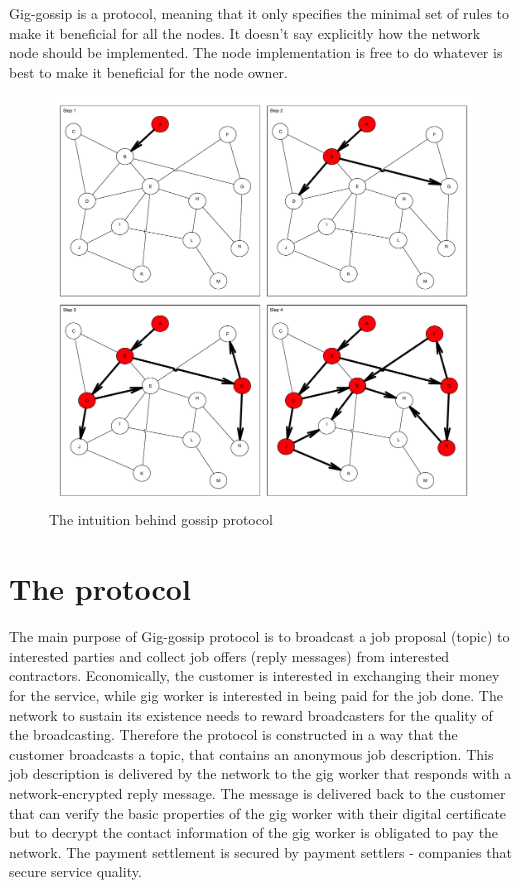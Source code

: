 \documentclass{article}
\begin{document}
Gig-gossip is a protocol, meaning that it only specifies the minimal set of rules to make it beneficial for all the nodes. It doesn't say explicitly how the network node should be implemented. The node implementation is free to do whatever is best to make it beneficial for the node owner.

\begin{figure}
	\centering
	\includegraphics[scale=0.4]{network.pdf}
	\caption{The intuition behind gossip protocol}
	\label{fig:network}
\end{figure}

\section{The protocol}

The main purpose of Gig-gossip protocol is to broadcast a job proposal (topic) to interested parties and collect job offers (reply messages) from interested contractors. Economically, the customer is interested in exchanging their money for the service, while gig worker is interested in being paid for the job done. The network to sustain its existence needs to reward broadcasters for the quality of the broadcasting. Therefore the protocol is constructed in a way that the customer broadcasts a topic, that contains an anonymous job description. This job description is delivered by the network to the gig worker that responds with a network-encrypted reply message. The message is delivered back to the customer that can verify the basic properties of the gig worker with their digital certificate but to decrypt the contact information of the gig worker is obligated to pay the network. The payment settlement is secured by payment settlers - companies that secure service quality.
\end{document}
